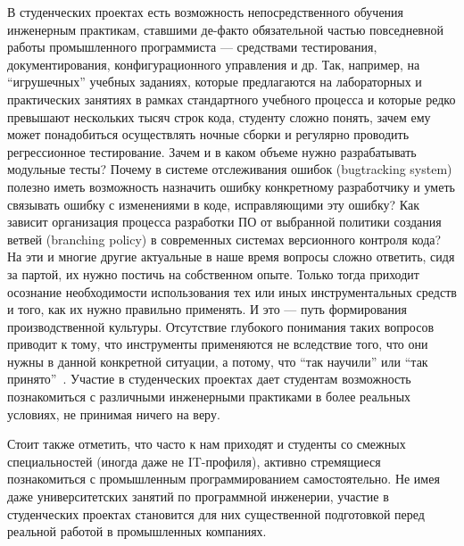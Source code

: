 \documentclass[a4paper]{article}
\begin{document}
В студенческих проектах есть возможность непосредственного обучения инженерным практикам, ставшими де-факто обязательной частью повседневной работы промышленного программиста --- средствами тестирования, документирования, конфигурационного управления и др. Так, например, на ``игрушечных'' учебных заданиях, которые предлагаются на лабораторных и практических занятиях в рамках стандартного учебного процесса и которые редко превышают нескольких тысяч строк кода, студенту сложно понять, зачем ему может понадобиться осуществлять ночные сборки и регулярно проводить регрессионное тестирование. Зачем и в каком объеме нужно разрабатывать модульные тесты? Почему в системе отслеживания ошибок (bugtracking system) полезно иметь возможность назначить ошибку конкретному разработчику и уметь связывать ошибку с изменениями в коде, исправляющими эту ошибку? Как зависит организация процесса разработки ПО от выбранной политики создания ветвей (branching policy) в современных системах версионного контроля кода? На эти и многие другие актуальные в наше время вопросы сложно ответить, сидя за партой, их нужно постичь на собственном опыте. Только тогда приходит осознание необходимости использования тех или иных инструментальных средств и того, как их нужно правильно применять. И это --- путь формирования производственной культуры. Отсутствие глубокого понимания таких вопросов приводит к тому, что инструменты применяются не вследствие того, что они нужны в данной конкретной ситуации, а потому, что ``так научили'' или ``так принято''~\cite{cargoCult}. Участие в студенческих проектах дает студентам возможность познакомиться с различными инженерными практиками в более реальных условиях, не принимая ничего на веру. 

Стоит также отметить, что часто к нам приходят и студенты со смежных специальностей (иногда даже не IT-профиля), активно стремящиеся познакомиться с промышленным программированием самостоятельно. Не имея даже университетских занятий по программной инженерии, участие в студенческих проектах становится для них существенной подготовкой перед реальной работой в промышленных компаниях.
\end{document}
